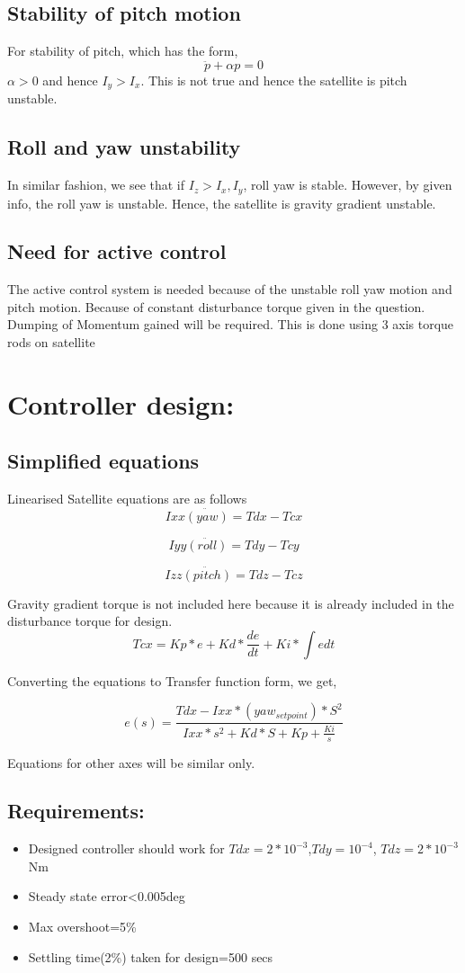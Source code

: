 \documentclass[10pt,a4paper]{report}
\begin{document}
\section{Stability of pitch motion}
For stability of pitch, which has the form,
\begin{equation}
\ddot{p}+\alpha p=0
\end{equation}
$ \alpha>0 $ and hence $ I_{y}>I_{x} $. This is not true and hence the satellite is pitch unstable.
\section{Roll and yaw unstability}
In similar fashion, we see that if $ I_{z}>I_{x},I_{y} $, roll yaw is stable. However, by given info, the roll yaw is unstable. Hence, the satellite is gravity gradient unstable. 
\section{Need for active control}
The active control system is needed because of the unstable roll yaw motion and pitch motion. Because of constant disturbance torque given in the question. Dumping of Momentum gained will be required. This is done using 3 axis torque rods on satellite
\chapter{Controller design:}
\section{Simplified equations}
Linearised Satellite equations are as follows
\[
Ixx\ddot{(yaw)}=Tdx-Tcx
\]

\[
Iyy\ddot{(roll)}=Tdy-Tcy
\]

\[
Izz\ddot{(pitch)}=Tdz-Tcz
\]

Gravity gradient torque is not included here because it is already
included in the disturbance torque for design. 
\[
Tcx=Kp*e+Kd*\dfrac{de}{dt}+Ki*\int edt
\]

Converting the equations to Transfer function form, we get,

\[
e(s)=\frac{Tdx-Ixx*(yaw_{setpoint})*S^{2}}{Ixx*s^{2}+Kd*S+Kp+\frac{Ki}{s}}
\]

Equations for other axes will be similar only.

\section{Requirements:}
\begin{itemize}
	\item Designed controller should work for $Tdx=2*10^{-3}$,$Tdy=10^{-4}$,
	$Tdz=2*10^{-3}$Nm
	\item Steady state error<0.005deg
	\item Max overshoot=5\%
	\item Settling time(2\%) taken for design=500 secs
\end{itemize}
\end{document}
